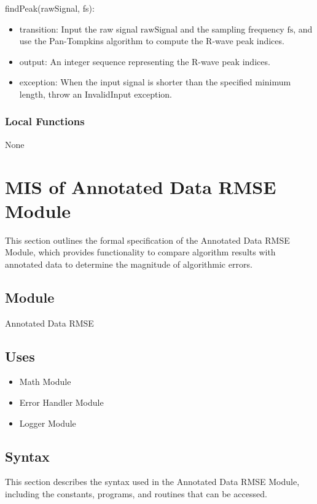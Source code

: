 \documentclass[12pt, titlepage]{article}
\begin{document}
\noindent findPeak(rawSignal, fs):
\begin{itemize}
\item transition: Input the raw signal $\text{rawSignal}$ and the sampling
frequency $\text{fs}$, and use the Pan-Tompkins algorithm to compute the R-wave
peak indices.
\item output: An integer sequence representing the R-wave peak indices.
\item exception: When the input signal is shorter than the specified minimum
length, throw an InvalidInput exception.
\end{itemize}

\subsubsection{Local Functions}

None

\newpage

\section{MIS of Annotated Data RMSE Module} \label{MIS_RMSE}

This section outlines the formal specification of the Annotated Data RMSE
Module, which provides functionality to compare algorithm results with annotated
data to determine the magnitude of algorithmic errors.

\subsection{Module}

Annotated Data RMSE

\subsection{Uses}

\begin{itemize}
\item Math Module
\item Error Handler Module
\item Logger Module
\end{itemize}

\subsection{Syntax}

This section describes the syntax used in the Annotated Data RMSE Module,
including the constants, programs, and routines that can be accessed.
\end{document}
